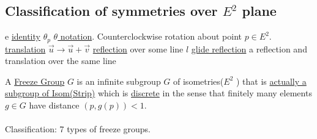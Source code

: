 \documentclass[class=scrartcl, crop=false]{standalone}
\begin{document}
\subsection{Classification of symmetries over $E^2$ plane}

\begin{enumerate}
  \ii
  e \ul{identity}
  \ii
  $\theta_p$ \ul{$\theta$ notation}. Counterclockwise rotation about point $p \in E^2$.
  \ii
  \ul{translation} $\vec{u} \to \vec{u} + \vec{v}$
  \ii
  \ul{reflection} over some line $l$
  \ii
  \ul{glide reflection} a reflection and translation over the same line
\end{enumerate} 

\begin{definition}
  A \ul{Freeze Group} $G$ is an infinite subgroup $G$ of isometries($E^2$ ) that is \ul{actually a subgroup of Isom(Strip)} which is \ul{discrete} in the sense that finitely many elements $g \in G$ have distance $(p, g(p)) < 1$.
  \\\\
  Classification: 7 types of freeze groups.


\end{definition} 
\end{document}
